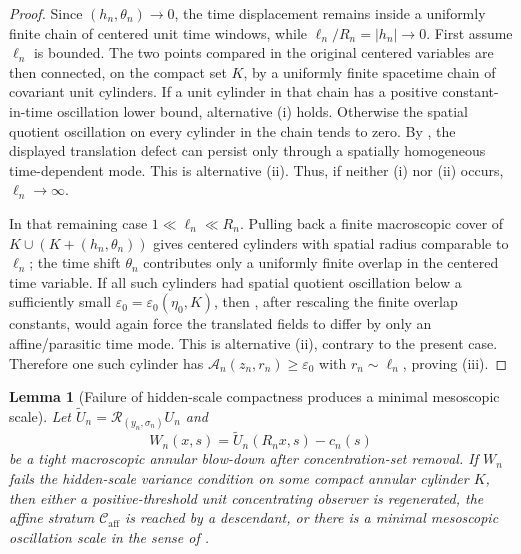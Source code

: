 \documentclass[11pt]{amsart}
\numberwithin{equation}{section}
\theoremstyle{plain}
\newtheorem{lemma}[lemma]{Lemma}
\theoremstyle{definition}
\theoremstyle{remark}
\newcommand{\calR}{\mathcal R}
\newcommand{\Caff}{\mathcal C_{\mathrm{aff}}}
\begin{document}
\begin{proof}
Since \((h_n,\theta_n)\to0\), the time displacement remains inside a uniformly
finite chain of centered unit time windows, while \(\ell_n/R_n=|h_n|\to0\).
First assume \(\ell_n\) is bounded.  The two points compared in the original
centered variables are then connected, on the compact set \(K\), by a
uniformly finite spacetime chain of covariant unit cylinders.  If a unit
cylinder in that chain has a positive constant-in-time oscillation lower bound,
alternative (i) holds.  Otherwise the spatial quotient oscillation on every
cylinder in the chain tends to zero.
By , the displayed translation
defect can persist only through a spatially homogeneous time-dependent mode.
This is alternative (ii).  Thus, if neither (i) nor (ii) occurs,
\(\ell_n\to\infty\).

In that remaining case \(1\ll\ell_n\ll R_n\).  Pulling back a finite
macroscopic cover of \(K\cup(K+(h_n,\theta_n))\) gives centered cylinders with
spatial radius comparable to \(\ell_n\); the time shift \(\theta_n\) contributes
only a uniformly finite overlap in the centered time variable.  If all such
cylinders had spatial quotient oscillation below a sufficiently small
\(\varepsilon_0=\varepsilon_0(\eta_0,K)\), then
, after rescaling the finite
overlap constants, would again force the translated fields to differ by only an
affine/parasitic time mode.  This is alternative (ii), contrary to the present
case.  Therefore one such cylinder has
\(\mathcal A_n(z_n,r_n)\ge\varepsilon_0\) with \(r_n\sim\ell_n\), proving
(iii).
\end{proof}

\begin{lemma}[Failure of hidden-scale compactness produces a minimal mesoscopic scale]
\label{lem:h2-failure-first-bad-scale}
Let \(\widetilde U_n=\calR_{(y_n,\sigma_n)}U_n\) and
\[
   W_n(x,s)=\widetilde U_n(R_nx,s)-c_n(s)
\]
be a tight macroscopic
annular blow-down after concentration-set removal.  If \(W_n\) fails the
hidden-scale variance condition on some compact annular cylinder \(K\), then
either a positive-threshold unit concentrating observer is regenerated, the affine
stratum \(\Caff\) is reached by a descendant, or there is a minimal
mesoscopic oscillation scale in the sense of
.
\end{lemma}
\end{document}
